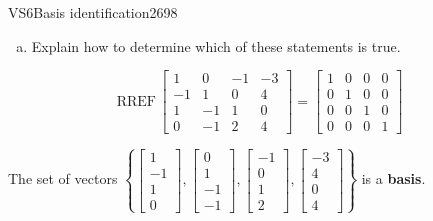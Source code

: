 \begin{exercise}{VS6}{Basis identification}{2698}
\begin{exerciseStatement}
\begin{enumerate}[(a)]
\begin{itemize}
 
\end{itemize}

     
\item  

 Explain how to determine which of these statements is true. 

 
\end{enumerate}

     \end{exerciseStatement}
 \begin{exerciseAnswer} 

 \[
\mathrm{RREF}\, \left[\begin{array}{cccc}
1 & 0 & -1 & -3 \\
-1 & 1 & 0 & 4 \\
1 & -1 & 1 & 0 \\
0 & -1 & 2 & 4
\end{array}\right] = \left[\begin{array}{cccc}
1 & 0 & 0 & 0 \\
0 & 1 & 0 & 0 \\
0 & 0 & 1 & 0 \\
0 & 0 & 0 & 1
\end{array}\right]
            \] 

 

 The set of vectors \(\left\{ \left[\begin{array}{c}
1 \\
-1 \\
1 \\
0
\end{array}\right] , \left[\begin{array}{c}
0 \\
1 \\
-1 \\
-1
\end{array}\right] , \left[\begin{array}{c}
-1 \\
0 \\
1 \\
2
\end{array}\right] , \left[\begin{array}{c}
-3 \\
4 \\
0 \\
4
\end{array}\right] \right\}\) is a \textbf{basis}. 

 \end{exerciseAnswer}
 \end{exercise}


